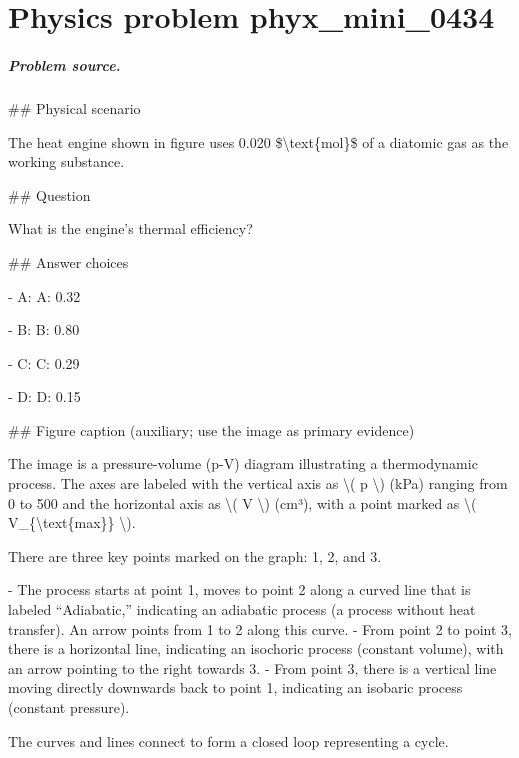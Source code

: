 
\chapter{Physics problem phyx\_mini\_0434}
\label{ch:PhyXMiniProblems_problem_phyx_mini_0434}

\paragraph{Problem source.}
\#\# Physical scenario

The heat engine shown in figure uses 0.020 \$\textbackslash{}text\{mol\}\$ of a diatomic gas as the working substance.

\#\# Question

What is the engine's thermal efficiency?

\#\# Answer choices

- A: A: 0.32

- B: B: 0.80

- C: C: 0.29

- D: D: 0.15

\#\# Figure caption (auxiliary; use the image as primary evidence)

The image is a pressure-volume (p-V) diagram illustrating a thermodynamic process. The axes are labeled with the vertical axis as \textbackslash{}( p \textbackslash{}) (kPa) ranging from 0 to 500 and the horizontal axis as \textbackslash{}( V \textbackslash{}) (cm³), with a point marked as \textbackslash{}( V\_\{\textbackslash{}text\{max\}\} \textbackslash{}).

There are three key points marked on the graph: 1, 2, and 3. 

- The process starts at point 1, moves to point 2 along a curved line that is labeled “Adiabatic,” indicating an adiabatic process (a process without heat transfer). An arrow points from 1 to 2 along this curve.
- From point 2 to point 3, there is a horizontal line, indicating an isochoric process (constant volume), with an arrow pointing to the right towards 3.
- From point 3, there is a vertical line moving directly downwards back to point 1, indicating an isobaric process (constant pressure).

The curves and lines connect to form a closed loop representing a cycle.

